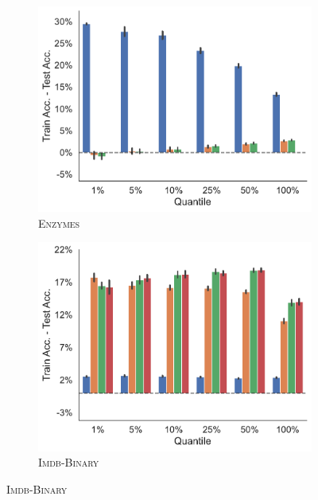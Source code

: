 \begin{figure}[!htb]
	\centering
	\begin{subfigure}[b]{0.3\textwidth}
		\centering
		\includegraphics[width=\textwidth]{Figures/train_test_diff_k_wl_ENZYMES.pdf}
		\vspace*{-4ex} 
		\caption{\textsc{Enzymes}}
	\end{subfigure}
	\hfill
	\begin{subfigure}[b]{0.3\textwidth}
		\centering
		\includegraphics[width=\textwidth]{Figures/train_test_diff_k_wl_IMDB-BINARY.pdf}
		\vspace*{-4ex} 
		\caption{\textsc{Imdb-Binary}}
	\end{subfigure}
	\hfill

\end{figure}

